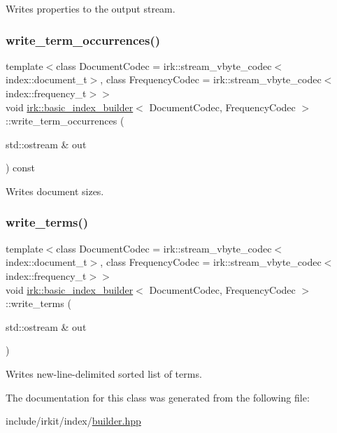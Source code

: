 Writes properties to the output stream. 

\mbox{\label{classirk_1_1basic__index__builder_af432f500e307f241c961163e6388b050}} 
\subsubsection{\texorpdfstring{write\+\_\+term\+\_\+occurrences()}{write\_term\_occurrences()}}
{\footnotesize\ttfamily template$<$class Document\+Codec  = irk\+::stream\+\_\+vbyte\+\_\+codec$<$index\+::document\+\_\+t$>$, class Frequency\+Codec  = irk\+::stream\+\_\+vbyte\+\_\+codec$<$index\+::frequency\+\_\+t$>$$>$ \\
void \mbox{\hyperlink{classirk_1_1basic__index__builder}{irk\+::basic\+\_\+index\+\_\+builder}}$<$ Document\+Codec, Frequency\+Codec $>$\+::write\+\_\+term\+\_\+occurrences (\begin{DoxyParamCaption}\item[{std\+::ostream \&}]{out }\end{DoxyParamCaption}) const\hspace{0.3cm}{\ttfamily [inline]}}



Writes document sizes. 

\mbox{\label{classirk_1_1basic__index__builder_a23dc2edc635553b5b9a0f1e2ba0961fa}} 
\subsubsection{\texorpdfstring{write\+\_\+terms()}{write\_terms()}}
{\footnotesize\ttfamily template$<$class Document\+Codec  = irk\+::stream\+\_\+vbyte\+\_\+codec$<$index\+::document\+\_\+t$>$, class Frequency\+Codec  = irk\+::stream\+\_\+vbyte\+\_\+codec$<$index\+::frequency\+\_\+t$>$$>$ \\
void \mbox{\hyperlink{classirk_1_1basic__index__builder}{irk\+::basic\+\_\+index\+\_\+builder}}$<$ Document\+Codec, Frequency\+Codec $>$\+::write\+\_\+terms (\begin{DoxyParamCaption}\item[{std\+::ostream \&}]{out }\end{DoxyParamCaption})\hspace{0.3cm}{\ttfamily [inline]}}



Writes new-\/line-\/delimited sorted list of terms. 



The documentation for this class was generated from the following file\+:\begin{DoxyCompactItemize}
\item 
include/irkit/index/\mbox{\hyperlink{builder_8hpp}{builder.\+hpp}}\end{DoxyCompactItemize}
